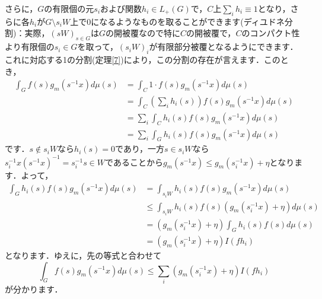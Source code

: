 \begin{Proof}
さらに，$G$の有限個の元$s_{i}$および関数$h_i \in L_{+}(G)$で，$C$上$\sum_{i}h_i \equiv 1$となり，さらに各$h_i$が$G \setminus s_{i}W$上で0になるようなものを取ることができます(ディユドネ分割)：実際，$(sW)_{s \in G}$は$G$の開被覆なので特に$C$の開被覆で，$C$のコンパクト性より有限個の$s_i \in G$を取って，$(s_{i}W)_{i}$が有限部分被覆となるようにできます．これに対応する1の分割(定理\ref{7})により，この分割の存在が言えます．このとき，
\begin{align*}
\int_{G}f(s)g_{m}(s^{-1}x)d\mu(s) & =\int_{C}1 \cdot f(s)g_{m}(s^{-1}x)d\mu(s) \\
 & =\int_{C} \left( \sum_{i}h_{i}(s) \right) f(s)g_{m}(s^{-1}x)d\mu(s) \\
 & =\sum_{i} \int_{C}h_{i}(s)f(s)g_{m}(s^{-1}x)d\mu(s) \\
 & =\sum_{i} \int_{G}h_{i}(s)f(s)g_{m}(s^{-1}x)d\mu(s)
\end{align*}
です．$s \not\in s_{i}W$なら$h_{i}(s)=0$であり，一方$s \in s_{i}W$なら$s_{i}^{-1}x(s^{-1}x)^{-1}=s_{i}^{-1}s \in W$であることから$g_{m}(s^{-1}x) \le g_{m}(s_{i}^{-1}x) + \eta$となります．よって， 
\begin{align*}
\int_{G}h_{i}(s)f(s)g_{m}(s^{-1}x)d\mu(s) & =\int_{s_{i}W}h_{i}(s)f(s)g_{m}(s^{-1}x)d\mu(s) \\
 & \le \int_{s_{i}W}h_{i}(s)f(s)\left( g_{m}(s_{i}^{-1}x) + \eta \right) d\mu(s) \\
 & =\left( g_{m}(s_{i}^{-1}x) + \eta \right) \int_{G}h_{i}(s)f(s)d\mu(s) \\
 & =\left( g_{m}(s_{i}^{-1}x) + \eta \right)I(fh_{i})
\end{align*}
となります．ゆえに，先の等式と合わせて
\begin{equation}
\int_{G}f(s)g_{m}(s^{-1}x)d\mu(s) \le \sum_{i}\left( g_{m}(s_{i}^{-1}x) + \eta \right)I(fh_{i}) 
\label{i1}
\end{equation}
が分かります．


\end{Proof}
